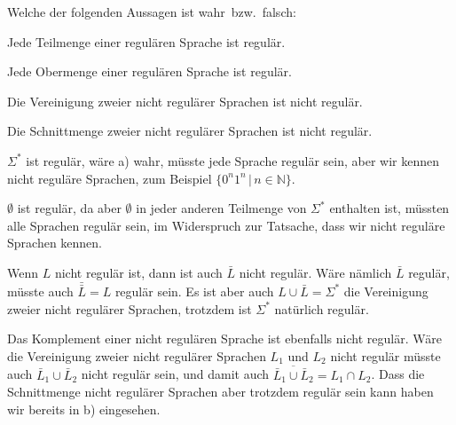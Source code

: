 Welche der folgenden Aussagen ist wahr~bzw.~falsch:
\begin{teilaufgaben}
\item Jede Teilmenge einer regulären Sprache ist regulär.
\item Jede Obermenge einer regulären Sprache ist regulär.
\item Die Vereinigung zweier nicht regulärer Sprachen ist nicht regulär.
\item Die Schnittmenge zweier nicht regulärer Sprachen ist nicht
regulär.
\end{teilaufgaben}


\begin{loesung}
\begin{teilaufgaben}
\item $\Sigma^*$ ist regulär, wäre a) wahr, müsste jede Sprache regulär
sein, aber wir kennen nicht reguläre Sprachen, zum Beispiel
$\{0^n1^n\,|\,n\in\mathbb N\}$.
\item $\emptyset$ ist regulär, da aber $\emptyset$ in jeder anderen
Teilmenge von $\Sigma^*$ enthalten ist, müssten alle Sprachen regulär
sein, im Widerspruch zur Tatsache, dass wir nicht reguläre Sprachen
kennen.
\item Wenn $L$ nicht regulär ist, dann ist auch $\bar L$ nicht regulär.
Wäre nämlich $\bar L$ regulär, müsste auch $\bar{\bar L}=L$ regulär
sein. Es ist aber auch $L\cup \bar L=\Sigma^*$ die Vereinigung zweier
nicht regulärer Sprachen, trotzdem ist $\Sigma^*$ natürlich regulär.
\item Das Komplement einer nicht regulären Sprache ist ebenfalls nicht
regulär. Wäre die Vereinigung zweier nicht regulärer Sprachen $L_1$
und $L_2$ nicht regulär müsste auch $\bar L_1\cup \bar L_2$ nicht
regulär sein, und damit auch $\overline{\bar L_1\cup \bar L_2}=L_1\cap L_2$.
Dass die Schnittmenge nicht regulärer Sprachen aber trotzdem regulär
sein kann haben wir bereits in b) eingesehen.
\qedhere
\end{teilaufgaben}
\end{loesung}

